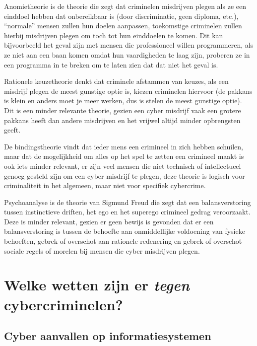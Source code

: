 \documentclass[
]{article}
\begin{document}
Anomietheorie is de theorie die zegt dat criminelen misdrijven plegen
als ze een einddoel hebben dat onbereikbaar is (door discriminatie, geen
diploma, etc.), ``normale'' mensen zullen hun doelen aanpassen,
toekomstige criminelen zullen hierbij misdrijven plegen om toch tot hun
einddoelen te komen. Dit kan bijvoorbeeld het geval zijn met mensen die
professioneel willen programmeren, als ze niet aan een baan komen omdat
hun vaardigheden te laag zijn, proberen ze in een programma in te breken
om te laten zien dat dat niet het geval is.

Rationele keuzetheorie denkt dat criminele afstammen van keuzes, als een
misdrijf plegen de meest gunstige optie is, kiezen criminelen hiervoor
(de pakkans is klein en anders moet je meer werken, dus is stelen de
meest gunstige optie). Dit is een minder relevante theorie, gezien een
cyber misdrijf vaak een grotere pakkans heeft dan andere misdrijven en
het vrijwel altijd minder opbrengsten geeft.

De bindingstheorie vindt dat ieder mens een crimineel in zich hebben
schuilen, maar dat de mogelijkheid om alles op het spel te zetten een
crimineel maakt is ook iets minder relevant, er zijn veel mensen die
niet technisch of intellectueel genoeg gesteld zijn om een cyber
misdrijf te plegen, deze theorie is logisch voor criminaliteit in het
algemeen, maar niet voor specifiek cybercrime.

Psychoanalyse is de theorie van Sigmund Freud die zegt dat een
balansverstoring tussen instinctieve driften, het ego en het superego
crimineel gedrag veroorzaakt. Deze is minder relevant, gezien er geen
bewijs is gevonden dat er een balansverstoring is tussen de behoefte aan
onmiddellijke voldoening van fysieke behoeften, gebrek of overschot aan
rationele redenering en gebrek of overschot sociale regels of morelen
bij mensen die cyber misdrijven plegen.
\pagebreak
\hypertarget{welke-wetten-zijn-er-tegen-cybercriminelen}{%
\section{\texorpdfstring{Welke wetten zijn er \emph{tegen}
cybercriminelen?}{Welke wetten zijn er tegen cybercriminelen?}}\label{welke-wetten-zijn-er-tegen-cybercriminelen}}

\hypertarget{cyber-aanvallen-op-informatiesystemen}{%
\subsection{Cyber aanvallen op
informatiesystemen}\label{cyber-aanvallen-op-informatiesystemen}}
\end{document}
